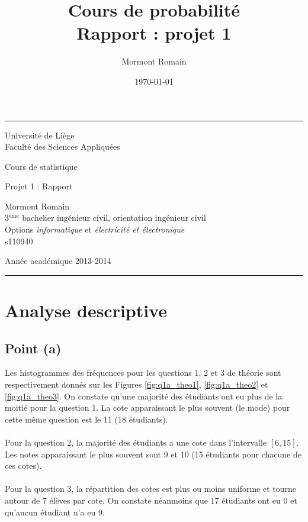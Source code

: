 \documentclass[a4paper,11pt]{article}
\title{Cours de probabilité\\ Rapport : projet 1}
\author{Mormont Romain}
\date{\today}
\begin{document}
\rule{1\linewidth}{1px}
{ \sc
\begin{center}
{\small Université de Liège}\\
{\small Faculté des Sciences Appliquées}

\end{center}

\vfill
\begin{center}
{\Huge Cours de statistique}
\end{center}
\begin{center}
{\Huge Projet 1 : Rapport}
\end{center}
\begin{center}
Mormont Romain\\
{\small 3$^{\text{ème}}$  bachelier ingénieur civil, orientation ingénieur civil}\\
{\small Options \textit{informatique} et \textit{électricité et électronique}}\\
{\small s110940}
\end{center}

\vfill
\begin{center}
Année académique 2013-2014\\
\end{center}
}
\rule{1\linewidth}{1px}
\newpage
\tableofcontents
\newpage
\section{Analyse descriptive}
\subsection{Point (a)}
Les histogrammes des fréquences pour les questions 1, 2 et 3 de théorie sont  respectivement donnés sur les Figures \ref{fig:q1a_theo1}, \ref{fig:q1a_theo2} et \ref{fig:q1a_theo3}. On constate qu'une majorité des étudiants ont eu plus de la moitié pour la question 1. La cote apparaissant le plus souvent (le mode) pour cette même question est le 11 (18 étudiants).
\paragraph{}
Pour la question 2, la majorité des étudiants a une cote dans l'intervalle $[6,15]$. Les notes apparaissant le plus souvent sont 9 et 10 (15 étudiants pour chacune de ces cotes).
\paragraph{}
Pour la question 3, la répartition des cotes est plus ou moins uniforme et tourne autour de 7 élèves par cote. On constate néanmoins que 17 étudiants ont eu 0 et qu'aucun étudiant n'a eu 9.
\end{document}
